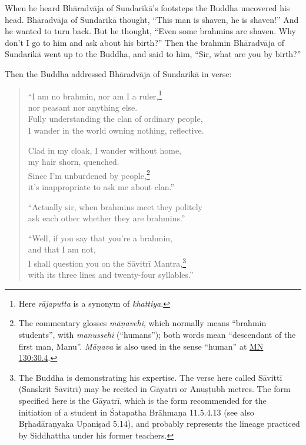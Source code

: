 \documentclass[12pt,openany]{book}%
\begin{document}
When he heard \textsanskrit{Bhāradvāja} of \textsanskrit{Sundarikā}’s footsteps the Buddha uncovered his head. \textsanskrit{Bhāradvāja} of \textsanskrit{Sundarikā} thought, “This man is shaven, he is shaven!” And he wanted to turn back. But he thought, “Even some brahmins are shaven. Why don’t I go to him and ask about his birth?” Then the brahmin \textsanskrit{Bhāradvāja} of \textsanskrit{Sundarikā} went up to the Buddha, and said to him, “Sir, what are you by birth?” 

Then the Buddha addressed \textsanskrit{Bhāradvāja} of \textsanskrit{Sundarikā} in verse: 

\begin{verse}%
“I am no brahmin, nor am I a ruler,\footnote{Here \textit{\textsanskrit{rājaputta}} is a synonym of \textit{khattiya}. } \\
nor peasant nor anything else. \\
Fully understanding the clan of ordinary people, \\
I wander in the world owning nothing, reflective. 

Clad in my cloak, I wander without home, \\
my hair shorn, quenched. \\
Since I’m unburdened by people,\footnote{The commentary glosses \textit{\textsanskrit{māṇavehi}}, which normally means “brahmin students”, with \textit{manussehi} (“humans”); both words mean “descendant of the first man, Manu”. \textit{\textsanskrit{Māṇava}} is also used in the sense “human” at \href{https://suttacentral.net/mn130/en/sujato\#30.4}{MN 130:30.4}. } \\
it’s inappropriate to ask me about clan.” 

“Actually sir, when brahmins meet they politely \\
ask each other whether they are brahmins.” 

“Well, if you say that you’re a brahmin, \\
and that I am not, \\
I shall question you on the \textsanskrit{Sāvitrī} Mantra,\footnote{The Buddha is demonstrating his expertise. The verse here called \textsanskrit{Sāvittī} (Sanskrit \textsanskrit{Sāvitrī}) may be recited in \textsanskrit{Gāyatrī} or \textsanskrit{Anuṣṭubh} metres. The form specified here is the \textsanskrit{Gāyatrī}, which is the form recommended for the initiation of a student in Śatapatha \textsanskrit{Brāhmaṇa} 11.5.4.13 (see also \textsanskrit{Bṛhadāraṇyaka} \textsanskrit{Upaniṣad} 5.14), and probably represents the lineage practiced by Siddhattha under his former teachers. } \\
with its three lines and twenty-four syllables.” 


\end{verse}
\end{document}

